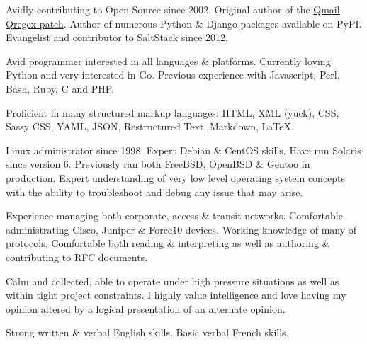 \documentclass{eab-cv}
\begin{document}


\stoptimeline


Avidly contributing to Open Source since 2002.  Original author of the
\href{http://borgstrom.ca/qregex.patch-20020129.txt}{Qmail Qregex patch}.  Author of numerous Python \& Django packages
available on PyPI.  Evangelist and contributor to \href{http://saltstack.org/}{SaltStack}
\href{https://github.com/saltstack/salt/commit/744fc0bd32d6f527c1f9e12cdca5bc7ab68f351e}{since 2012}.

Avid programmer interested in all languages \& platforms.  Currently loving Python and very interested in Go.  Previous
experience with Javascript, Perl, Bash, Ruby, C and PHP.

Proficient in many structured markup languages: HTML, XML (yuck), CSS, Sassy CSS, YAML, JSON, Restructured Text,
Markdown, \LaTeX.

Linux administrator since 1998.  Expert Debian \& CentOS skills.  Have run Solaris since version 6.  Previously ran both
FreeBSD, OpenBSD \& Gentoo in production.  Expert understanding of very low level operating system concepts with the
ability to troubleshoot and debug any issue that may arise.

Experience managing both corporate, access \& transit networks.  Comfortable administrating Cisco, Juniper \& Force10
devices.  Working knowledge of many of protocols.  Comfortable both reading \& interpreting as well as authoring \&
contributing to RFC documents.

Calm and collected, able to operate under high pressure situations as well as within tight project constraints.  I
highly value intelligence and love having my opinion altered by a logical presentation of an alternate opinion.

 Strong written \& verbal English skills.  Basic verbal French skills.
\end{document}
